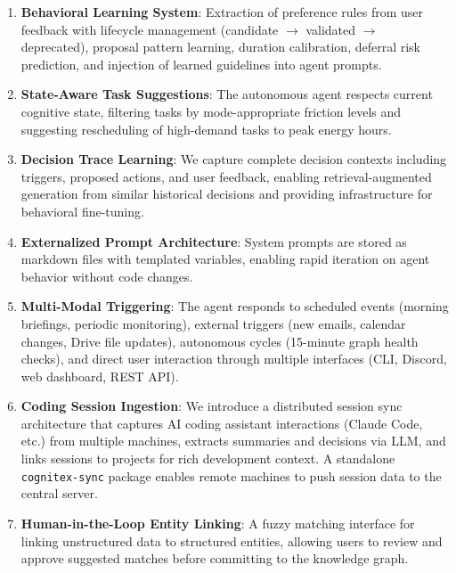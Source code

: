 \documentclass[11pt,a4paper]{article}
\begin{document}
\begin{enumerate}
    \item \textbf{Behavioral Learning System}: Extraction of preference rules from user feedback with lifecycle management (candidate $\rightarrow$ validated $\rightarrow$ deprecated), proposal pattern learning, duration calibration, deferral risk prediction, and injection of learned guidelines into agent prompts.

    \item \textbf{State-Aware Task Suggestions}: The autonomous agent respects current cognitive state, filtering tasks by mode-appropriate friction levels and suggesting rescheduling of high-demand tasks to peak energy hours.

    \item \textbf{Decision Trace Learning}: We capture complete decision contexts including triggers, proposed actions, and user feedback, enabling retrieval-augmented generation from similar historical decisions and providing infrastructure for behavioral fine-tuning.

    \item \textbf{Externalized Prompt Architecture}: System prompts are stored as markdown files with templated variables, enabling rapid iteration on agent behavior without code changes.

    \item \textbf{Multi-Modal Triggering}: The agent responds to scheduled events (morning briefings, periodic monitoring), external triggers (new emails, calendar changes, Drive file updates), autonomous cycles (15-minute graph health checks), and direct user interaction through multiple interfaces (CLI, Discord, web dashboard, REST API).

    \item \textbf{Coding Session Ingestion}: We introduce a distributed session sync architecture that captures AI coding assistant interactions (Claude Code, etc.) from multiple machines, extracts summaries and decisions via LLM, and links sessions to projects for rich development context. A standalone \texttt{cognitex-sync} package enables remote machines to push session data to the central server.

    \item \textbf{Human-in-the-Loop Entity Linking}: A fuzzy matching interface for linking unstructured data to structured entities, allowing users to review and approve suggested matches before committing to the knowledge graph.
\end{enumerate}
\end{document}
